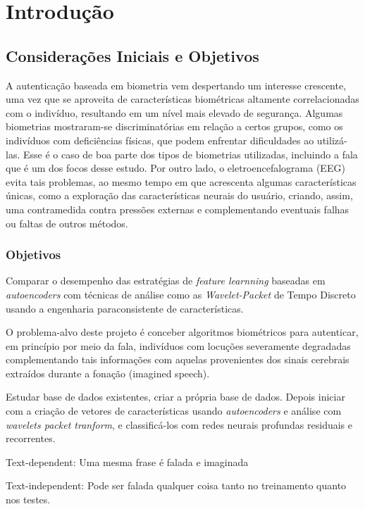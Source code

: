 \chapter{Introdução}
	\section{Considerações Iniciais e Objetivos}
	
		\par A autenticação baseada em biometria vem despertando um interesse crescente, uma vez que se aproveita de características biométricas altamente correlacionadas com o indivíduo, resultando em um nível mais elevado de segurança. Algumas biometrias mostraram-se discriminatórias em relação a certos grupos, como os indivíduos com deficiências físicas, que podem enfrentar dificuldades ao utilizá-las. Esse é o caso de boa parte dos tipos de biometrias utilizadas, incluindo a fala que é um dos focos desse estudo. Por outro lado, o eletroencefalograma (EEG) evita tais problemas, ao mesmo tempo em que acrescenta algumas características únicas, como a exploração das características neurais do usuário, criando, assim, uma contramedida contra pressões externas e complementando eventuais falhas ou faltas de outros métodos.
	
		\subsection{Objetivos}
			\par Comparar o desempenho das estratégias de \textit{feature learnning} baseadas em \textit{autoencoders} com técnicas de análise como as \textit{Wavelet-Packet} de Tempo Discreto usando a engenharia paraconsistente de características.
			\par O problema-alvo deste projeto é conceber algoritmos biométricos para autenticar, em princípio por meio da fala,  indivíduos com locuções severamente degradadas complementando tais informações com aquelas provenientes dos sinais cerebrais extraídos durante a fonação (imagined speech).
			\par Estudar base de dados existentes, criar a própria base de dados. Depois iniciar com a criação de vetores de características usando \textit{autoencoders} e análise com \textit{wavelets packet tranform}, e classificá-los com redes neurais profundas residuais e recorrentes.
			\par Text-dependent: Uma mesma frase é falada e imaginada
			\par Text-independent: Pode ser falada qualquer coisa tanto no treinamento quanto nos testes.
